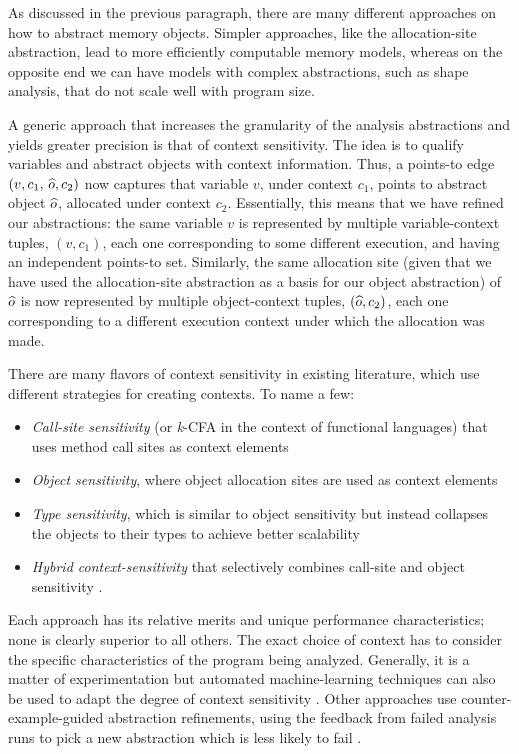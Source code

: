As discussed in the previous paragraph, there are many different
approaches on how to abstract memory objects. Simpler approaches, like
the allocation-site abstraction, lead to more efficiently computable
memory models, whereas on the opposite end we can have models with
complex abstractions, such as shape analysis, that do not scale well
with program size.

A generic approach that increases the granularity of the analysis
abstractions and yields greater precision is that of context
sensitivity. The idea is to qualify variables and abstract objects
with context information. Thus, a points-to edge
\((v, c_1,\, \widehat{o}, c_2)\) now captures that variable \(v\), under
context \(c_1\), points to abstract object \(\widehat{o}\), allocated
under context \(c_2\). Essentially, this means that we have refined
our abstractions: the same variable \(v\) is represented by multiple
variable-context tuples, \((v, c_1)\), each one corresponding to some
different execution, and having an independent points-to
set. Similarly, the same allocation site (given that we have used the
allocation-site abstraction as a basis for our object abstraction) of
\(\widehat{o}\) is now represented by multiple object-context tuples,
\((\widehat{o}, c_2)\), each one corresponding to a different execution
context under which the allocation was made.

There are many flavors of context sensitivity in existing literature,
which use different strategies for creating contexts. To name a few:
\begin{itemize}[--]
\item \emph{Call-site sensitivity} (or \emph{k}-CFA in the context of
  functional languages) that uses method call sites as context
  elements \cite{Sharir:Interprocedural,shivers:thesis}
\item \emph{Object sensitivity}, where object allocation sites are used as
  context elements \cite{issta/MilanovaRR02,tosem/MilanovaRR05}
\item \emph{Type sensitivity}, which is similar to object sensitivity but
  instead collapses the objects to their types to achieve better
  scalability \cite{popl/SmaragdakisBL11}
\item \emph{Hybrid context-sensitivity} that selectively combines
  call-site and object sensitivity \cite{pldi/KastrinisS13}.
\end{itemize}
Each approach has its relative merits and unique performance
characteristics; none is clearly superior to all others. The exact
choice of context has to consider the specific characteristics of the
program being analyzed. Generally, it is a matter of experimentation
but automated machine-learning techniques can also be used to adapt
the degree of context sensitivity
\cite{oopsla/OhYY15,pldi/LiangN11,popl/LiangTN11,popl/GrigoreY16}.
%
Other approaches use counter-example-guided abstraction refinements,
using the feedback from failed analysis runs to pick a new abstraction
which is less likely to fail
\cite{pldi/ZhangNY13,pldi/ZhangMGNY14,tacas/GulavaniR06}.

